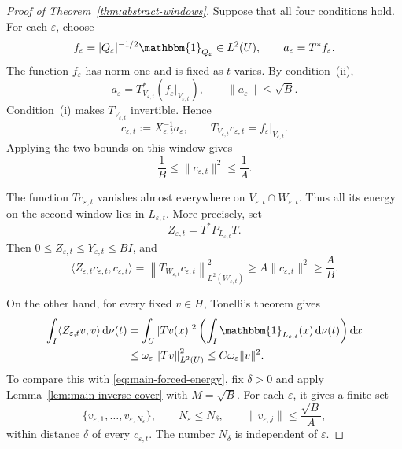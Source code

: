 \documentclass[12pt,reqno,tbtags]{amsart}
\def\d{\mathrm{d}}
\newcommand\norm[1]{\|#1\|}
\newcommand\inpro[2]{\langle #1,#2\rangle}
\newcommand\1{\mathbbm{1}}
\newcommand\Norm[2]{\left\|#1\right\|_{#2}}
\newcommand{\eps}{\varepsilon}
\def\d{\mathrm{d}}
\begin{document}
\begin{proof}[Proof of Theorem~\ref{thm:abstract-windows}]
Suppose that all four conditions hold. For each $\eps$, choose
\begin{equation*}
    f_\eps=|Q_\eps|^{-1/2}\1_{Q_\eps}\in L^2(U),
    \qquad a_\eps=T^*f_\eps.
\end{equation*}
The function $f_\eps$ has norm one and is fixed as $t$ varies.
By condition~(ii),
\begin{equation*}
    a_\eps=T_{V_{\eps,t}}^*(f_\eps|_{V_{\eps,t}}),
    \qquad\norm{a_\eps}\le\sqrt B.
\end{equation*}
Condition~(i) makes $T_{V_{\eps,t}}$ invertible. Hence
\begin{equation}\label{eq:main-exact-reconstruction}
    c_{\eps,t}:=X_{\eps,t}^{-1}a_\eps,
    \qquad T_{V_{\eps,t}}c_{\eps,t}=f_\eps|_{V_{\eps,t}}.
\end{equation}
Applying the two bounds on this window gives
\begin{equation}\label{eq:main-coefficient-size}
    \frac1B\le\norm{c_{\eps,t}}^2\le\frac1A.
\end{equation}

The function $Tc_{\eps,t}$ vanishes almost everywhere on
$V_{\eps,t}\cap W_{\eps,t}$. Thus all its energy on the second window lies in
$L_{\eps,t}$. More precisely, set
\begin{equation*}
    Z_{\eps,t}=T^*P_{L_{\eps,t}}T.
\end{equation*}
Then $0\le Z_{\eps,t}\le Y_{\eps,t}\le BI$, and
\begin{equation}\label{eq:main-forced-energy}
    \inpro{Z_{\eps,t}c_{\eps,t}}{c_{\eps,t}}
    =\Norm{T_{W_{\eps,t}}c_{\eps,t}}{L^2(W_{\eps,t})}^2
    \ge A\norm{c_{\eps,t}}^2\ge\frac AB.
\end{equation}

On the other hand, for every fixed $v\in H$, Tonelli's theorem gives
\begin{equation}\label{eq:main-fixed-energy}
    \begin{aligned}
    \int_I\inpro{Z_{\eps,t}v}{v}\,\d\nu(t)
    &=\int_U|Tv(x)|^2
      \left(\int_I\1_{L_{\eps,t}}(x)\,\d\nu(t)\right)\d x\\
    &\le\omega_\eps\Norm{Tv}{L^2(U)}^2
     \le C\omega_\eps\norm{v}^2.
    \end{aligned}
\end{equation}
To compare this with \eqref{eq:main-forced-energy}, fix $\delta>0$ and apply
Lemma~\ref{lem:main-inverse-cover} with $M=\sqrt B$. For each $\eps$, it gives
a finite set
\begin{equation*}
    \{v_{\eps,1},\ldots,v_{\eps,N_\eps}\},
    \qquad N_\eps\le N_\delta,
    \qquad\norm{v_{\eps,j}}\le\frac{\sqrt B}{A},
\end{equation*}
within distance $\delta$ of every $c_{\eps,t}$. The number $N_\delta$ is
independent of $\eps$.


\end{proof}
\end{document}
